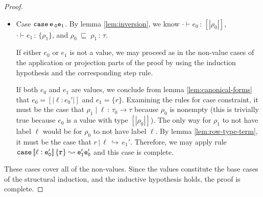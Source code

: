 \documentclass{article}
\newcommand{\variant}[1]{[\!|#1|\!]}
\newcommand{\case}[2]{\tt{case}\,#1\,#2}
\newcommand{\hastp}[3]{#1 \vdash #2 \,:\, #3}
\newcommand{\haslbl}[3]{#1\;|\;#2\,:\, #3}
\newcommand{\caseVarRcd}[3]{#1 \;\sqsubseteq\; #2 \,:\, #3}
\newcommand{\haslbltm}[3]{#1\,|\,#2\,\hookrightarrow\, #3}
\newcommand{\step}[2]{#1 \leadsto #2}
\begin{document}
\begin{proof}
\begin{itemize}
  \item Case \(\case e_0 e_1\). By lemma \ref{lem:inversion}, we know \(\hastp
    \cdot {e_0} {\variant {\rho_0}}\), \(\hastp \cdot {e_1} {\{\rho_1\}}\),
    and \(\caseVarRcd {\rho_0} {\rho_1} \tau\).

    If either \(e_0\) or \(e_1\) is not a value, we may proceed as in the
    non-value cases of the application or projection parts of the proof by using
    the induction hypothesis and the corresponding step rule.

    If both \(e_0\) and \(e_1\) are values, we conclude from lemma
    \ref{lem:canonical-forms} that \(e_0 = \variant{\ell : e_0'}\) and \(e_1 =
    \{r\}\). Examining the rules for case constraint, it must be the case that
    \(\haslbl {\rho_1} \ell {\tau_0 \to \tau}\) because \(\rho_0\) is nonempty
    (this is trivially true because \(e_0\) is a value with type \(\variant
    {\rho_0}\)). The only way for \(\rho_1\) to not have label \(\ell\) would be
    for \(\rho_0\) to not have label \(\ell\). By lemma \ref{lem:row-type-term},
    it must be the case that \(\haslbltm{r}{\ell}{e_1'}\). Therefore, we may
    apply rule \(\step {\case {\variant {\ell : e_0'}} {\{r\}}} {e_1' e_0'}\)
    and this case is complete.

\end{itemize}

These cases cover all of the non-values. Since the values constitute the base
cases of the structural induction, and the inductive hypothesis holds, the proof
is complete.

\end{proof}
\end{document}
